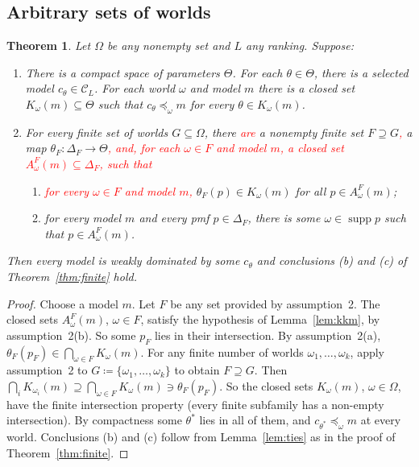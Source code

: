 \documentclass[11pt]{article}
\newtheorem{theorem}{Theorem}[section]
\theoremstyle{definition}
\newcommand{\C}{\mathcal C}
\newcommand{\supp}{\operatorname{supp}}
\newcommand{\new}[1]{\textcolor{red}{#1}}
\begin{document}
\subsection{Arbitrary sets of worlds}

\begin{theorem}\label{thm:local}
Let $\Omega$ be any nonempty set and $L$ any ranking. Suppose:
\begin{enumerate}[label=\arabic*.,leftmargin=*]
\item There is a compact space of parameters $\Theta$. For each $\theta\in\Theta$, there is a selected model $c_\theta\in\C_L$. For each world $\omega$ and model $m$ there is a closed set $K_\omega(m)\subseteq\Theta$ such that $c_\theta\preceq_\omega m$ for every $\theta\in K_\omega(m)$.
\item For every finite set of worlds $G\subseteq\Omega$, there \new{are} a nonempty finite set $F\supseteq G$\new{,} a map $\theta_F:\Delta_F\to\Theta$\new{, and, for each $\omega\in F$ and model $m$, a closed set $A^F_\omega(m)\subseteq\Delta_F$, such that}
\begin{enumerate}[label=(\alph*)]
\item \new{for every $\omega\in F$ and model $m$,} $\theta_F(p)\in K_\omega(m)$ for all $p\in A^F_\omega(m)$;
\item for every model $m$ and every pmf $p\in\Delta_F$, there is some $\omega\in\supp p$ such that $p\in A^F_\omega(m)$.
\end{enumerate}
\end{enumerate}
Then every model is weakly dominated by some $c_\theta$ and conclusions (b) and (c) of Theorem~\ref{thm:finite} hold.
\end{theorem}
\begin{proof}
Choose a model $m$. Let $F$ be any set provided by assumption~2. The closed sets $A^F_\omega(m)$, $\omega\in F$, satisfy the hypothesis of Lemma~\ref{lem:kkm}, by assumption~2(b). So some $p_F$ lies in their intersection. By assumption~2(a), $\theta_F(p_F)\in\bigcap_{\omega\in F}K_\omega(m)$. For any finite number of worlds $\omega_1,\dots,\omega_k$, apply assumption~2 to $G\coloneqq\{\omega_1,\dots,\omega_k\}$ to obtain $F\supseteq G$. Then $\bigcap_iK_{\omega_i}(m)\supseteq\bigcap_{\omega\in F}K_\omega(m)\ni\theta_F(p_F)$. So the closed sets $K_\omega(m)$, $\omega\in\Omega$, have the finite intersection property (every finite subfamily has a non-empty intersection). By compactness some $\theta^*$ lies in all of them, and $c_{\theta^*}\preceq_\omega m$ at every world. Conclusions (b) and (c) follow from Lemma~\ref{lem:ties} as in the proof of Theorem~\ref{thm:finite}.
\end{proof}
\end{document}
